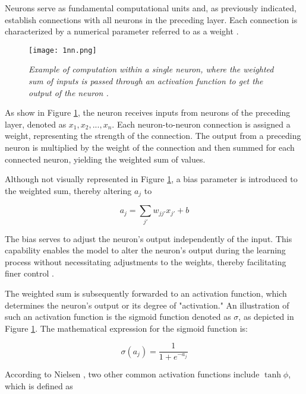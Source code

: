 Neurons serve as fundamental computational units and, as previously indicated, establish connections with all neurons in the preceding layer. Each connection is characterized by a numerical parameter referred to as a weight \cite{lipton2015critical}.


\begin{figure}[H]
    \centering
    \texttt{[image: 1nn.png]}
    \caption[Example of computation within a single neuron \cite{lipton2015critical}.]{
        \it{Example of computation within a single neuron, where the weighted sum
            of inputs is passed through an activation function to get the output of the neuron \cite{lipton2015critical}.}
    }
    \label{fig:1nn}
\end{figure}

As show in Figure \ref{fig:1nn}, the neuron receives inputs from neurons of the preceding layer, denoted as \(x_1, x_2, ..., x_n\). Each neuron-to-neuron connection is assigned a weight, representing the strength of the connection. The output from a preceding neuron is multiplied by the weight of the connection and then summed for each connected neuron, yielding the weighted sum of values.

Although not visually represented in Figure \ref{fig:1nn}, a bias parameter is introduced to the weighted sum, thereby altering \(a_j\) to

\begin{equation}
    a_j = \sum_{j'} w_{jj'}x_{j'} + b
\end{equation}

The bias serves to adjust the neuron's output independently of the input. This capability enables the model to alter the neuron's output during the learning process without necessitating adjustments to the weights, thereby facilitating finer control \cite{nnanddl}.

The weighted sum is subsequently forwarded to an activation function, which determines the neuron's output or its degree of "activation." An illustration of such an activation function is the sigmoid function denoted as \(\sigma\), as depicted in Figure \ref{fig:1nn}. The mathematical expression for the sigmoid function is:

\begin{equation}
    \sigma(a_j) = \frac{1}{1+e^{-a_j}}
\end{equation}

According to Nielsen \cite{nnanddl}, two other common activation functions include \(\tanh \phi\),
which is defined as

